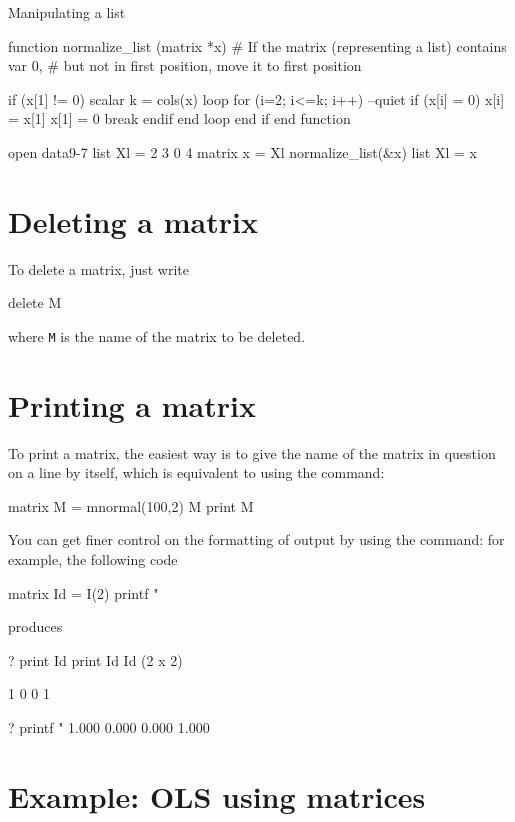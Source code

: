 \begin{script}[htbp]
  \caption{Manipulating a list}
  \label{normalize-list}
\begin{scode}
function normalize_list (matrix *x)
  # If the matrix (representing a list) contains var 0,
  # but not in first position, move it to first position

  if (x[1] != 0)
     scalar k = cols(x)
     loop for (i=2; i<=k; i++) --quiet
        if (x[i] = 0)
            x[i] = x[1]
            x[1] = 0
            break
         endif
     end loop
  end if
end function

open data9-7
list Xl = 2 3 0 4
matrix x = Xl
normalize_list(&x)
list Xl = x
\end{scode}
\end{script}


\section{Deleting a matrix}
\label{matrix-delete}

To delete a matrix, just write
%
\begin{code}
delete M
\end{code}
%
where \texttt{M} is the name of the matrix to be deleted.

\section{Printing a matrix}

To print a matrix, the easiest way is to give the name of the matrix
in question on a line by itself, which is equivalent to using the
 command:
%
\begin{code}
matrix M = mnormal(100,2)
M
print M
\end{code}

You can get finer control on the formatting of output by using the
 command: for example, the following code
%
\begin{code}
matrix Id = I(2)
printf "%
\end{code}
%
produces
\begin{code}
? print Id
 print Id
Id (2 x 2)

  1   0 
  0   1 

? printf "%
     1.000     0.000
     0.000     1.000
\end{code}

\section{Example: OLS using matrices}
\label{matrix-example}

